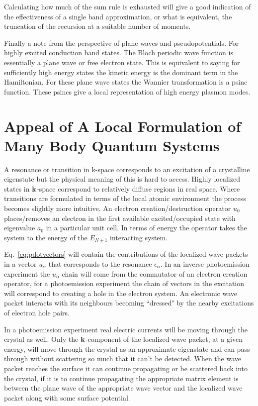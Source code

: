 Calculating how much of the sum rule is exhausted will give a good indication
of the effectiveness of a single band approximation, or what is equivalent,
the truncation of the recursion at a suitable number of moments.

Finally a note from the perspective of plane waves and pseudopotentials. For
highly excited conduction band states. The Bloch periodic wave function is
essentially a plane wave or free electron state. This is equivalent to saying for
sufficiently high energy states the kinetic energy is the dominant term in the Hamiltonian.
For these plane wave states the Wannier transformation is a psinc function. These psincs
give a local representation of high energy plasmon modes.

\section{Appeal of A Local Formulation of Many Body Quantum Systems}
 A resonance or transition in k-space corresponds to an excitation 
of a crystalline eigenstate but the physical meaning of this is hard to access. Highly
localized states in ${\bf k}$-space correspond to relatively diffuse regions in real space. Where
transitions are formulated in terms of the local atomic environment the process becomes slightly
more intuitive. An electron creation/destruction operator $u_{0}$ places/removes an electron in the 
first available excited/occupied state with eigenvalue $a_{0}$ in a particular unit cell. 
In terms of energy the operator takes the system to the energy 
of the $E_{N\pm1}$ interacting system. 

Eq.~\ref{eq:pdotvectors} will contain the contributions of the localized
wave packets in a vector $u_{\alpha}$ that corresponds to the resonance 
$\epsilon_{\alpha}$. In an inverse photoemission experiment the $u_{\alpha}$ chain
will come from the commutator of an electron creation operator, for a photoemission
experiment the chain of vectors in the excitation will correspond to creating a hole
in the electron system. An electronic wave packet interacts with its neighbours becoming
``dressed" by the nearby excitations of electron hole pairs. 

In a photoemission experiment real electric currents will be moving through the crystal as well.
Only the ${\bf k}$-component of the localized wave packet, at a given energy, will move through the crystal as 
an approximate eigenstate and can pass through without scattering so much that it can't be detected.
When the wave packet reaches the surface it can continue propagating
or be scattered back into the crystal, if it is to continue propagating the appropriate matrix element
is between the plane wave of the appropriate wave vector and the localized wave packet along with some
surface potential.


